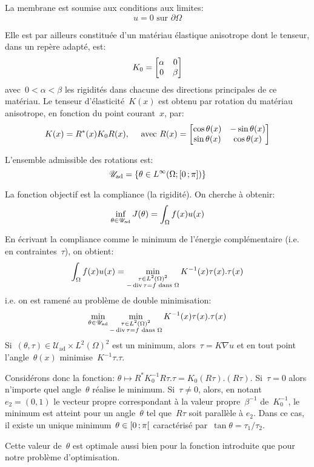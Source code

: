 La membrane est soumise aux conditions aux limites:
\[ u=0 \text{ sur }\partial\Omega \]

Elle est par ailleurs constituée d'un matériau élastique anisotrope dont le tenseur, dans un repère adapté, est:
\[ K_0 = \MM*{\alpha & 0\\0 &\beta} \]
avec~$0<\alpha<\beta$ les rigidités dans chacune des directions principales de ce matériau. Le tenseur d'élasticité~$K(x)$ est obtenu par rotation du matériau anisotrope, en fonction du point courant~$x$, par:
\[ K(x)=R^*(x)K_0R(x), \quad \text{ avec } R(x)=\MM*{\cos\theta(x) &-\sin\theta(x)\\ \sin\theta(x) & \cos\theta(x)} \]


L'ensemble admissible des rotations est:
\[ \mathscr{U}_{\text{ad}}=\{\theta\in L^\infty(\Omega;\mathopen{[}0\,;\pi\mathclose{]}) \} \]

\medskip
La fonction objectif est la compliance (la rigidité). On cherche à obtenir:
\[ \colorblue \inf_{\theta\in\mathscr{U}_{\text{ad}}} J(\theta)=\dint_\Omega f(x)u(x) \]

\medskip
En écrivant la compliance comme le minimum de l'énergie complémentaire (i.e. en contraintes~$\tau$), on obtient:
\[ \displaystyle\int_\Omega f(x)u(x) = \min_{\substack{\tau\in L^2(\Omega)^2\\ -\operatorname{div}\tau=f \text{ dans }\Omega}} K^{-1}(x)\tau(x).\tau(x) \]
i.e. on est ramené au problème de double minimisation:
\[ \min_{\theta\in\mathscr{U}_{\text{ad}}} \min_{\substack{\tau\in L^2(\Omega)^2\\ -\operatorname{div}\tau=f \text{ dans }\Omega}} K^{-1}(x)\tau(x).\tau(x)
\]
Si~$(\theta,\tau)\in\mathscr{U}_{\text{ad}}\times L^2(\Omega)^2$ est un minimum, alors~$\tau=K\nabla u$ et en tout point l'angle~$\theta(x)$ minimise~$K^{-1}\tau.\tau$.

Considérons donc la fonction: $\theta \mapsto R^*K_0^{-1}R\tau.\tau=K_0(R\tau).(R\tau)$.
Si~$\tau=0$ alors n'importe quel angle~$\theta$ réalise le minimum.
Si~$\tau\ne0$, alors, en notant~$e_2=(0,1)$ le vecteur propre correspondant à la valeur propre~$\beta^{-1}$ de~$K_0^{-1}$, le minimum est atteint pour un angle~$\theta$ tel que~$R\tau$ soit parallèle à $e_2$. Dans ce cas, il existe un unique minimum~$\theta\in\mathopen{[}0\,;\pi\mathclose{[}$ caractérisé par~$\tan\theta=\tau_1/\tau_2$.

Cette valeur de~$\theta$ est optimale aussi bien pour la fonction introduite que pour notre problème d'optimisation.

